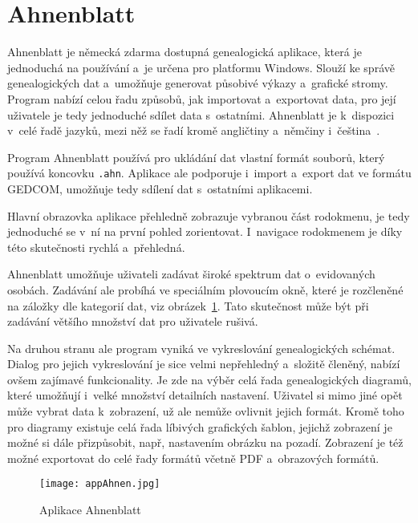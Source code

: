 		\section{Ahnenblatt}
		\label{sec:appAhnen}
		Ahnenblatt je německá zdarma dostupná genealogická aplikace, která je jednoduchá na používání a~je určena pro platformu Windows. Slouží ke správě genealogických dat a~umožňuje generovat působivé výkazy a~grafické stromy. Program nabízí celou řadu způsobů, jak importovat a~exportovat data, pro její uživatele je tedy jednoduché sdílet data s~ostatními. Ahnenblatt je k~dispozici v~celé řadě jazyků, mezi něž se řadí kromě angličtiny a~němčiny i~čeština~\cite{bib:ApliAhnenCom}. \par
		Program Ahnenblatt používá pro ukládání dat vlastní formát souborů, který používá koncovku \texttt{.ahn}. Aplikace ale podporuje i~import a~export dat ve formátu GEDCOM, umožňuje tedy sdílení dat s~ostatními aplikacemi. \par
		Hlavní obrazovka aplikace přehledně zobrazuje vybranou část rodokmenu, je tedy jednoduché se v~ní na první pohled zorientovat. I~navigace rodokmenem je díky této skutečnosti rychlá a~přehledná. \par
		Ahnenblatt umožňuje uživateli zadávat široké spektrum dat o~evidovaných osobách. Zadávání ale probíhá ve speciálním plovoucím okně, které je rozčleněné na záložky dle kategorií dat, viz obrázek~\ref{fig:appAhnen}. Tato skutečnost může být při zadávání většího množství dat pro uživatele rušivá. \par
		Na druhou stranu ale program vyniká ve vykreslování genealogických schémat. Dialog pro jejich vykreslování je sice velmi nepřehledný a~složitě členěný, nabízí ovšem zajímavé funkcionality. Je zde na výběr celá řada genealogických diagramů, které umožňují i~velké množství detailních nastavení. Uživatel si mimo jiné opět může vybrat data k~zobrazení, už ale nemůže ovlivnit jejich formát. Kromě toho pro diagramy existuje celá řada líbivých grafických šablon, jejichž zobrazení je možné si dále přizpůsobit, např, nastavením obrázku na pozadí. Zobrazení je též možné exportovat do celé řady formátů včetně PDF a~obrazových formátů. \par
		\begin{figure}[H]
			\centering
			\texttt{[image: appAhnen.jpg]}
			\caption{Aplikace Ahnenblatt}
			\label{fig:appAhnen}
		\end{figure}

